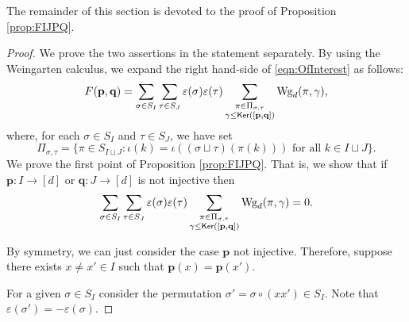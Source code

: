 \documentclass[11pt, a4paper, oneside, reqno]{amsart}
\newcommand{\copairpq}{{[{\bf p},{\bf q}]}}
\theoremstyle{remark}
\theoremstyle{definition}
\numberwithin{equation}{section}
\begin{document}

The remainder of this section is devoted to the proof of Proposition \ref{prop:FIJPQ}.
\begin{proof}
We prove the two assertions in the statement separately. By using the Weingarten calculus, we expand the right hand-side of \eqref{eqn:OfInterest} as follows:
\begin{equation}
	\label{eqn:FIJPQ}
	F({\bf p}, {\bf q}) = \sum_{\sigma \in S_I}\sum_{\tau \in S_J}\varepsilon(\sigma)\varepsilon(\tau)
	\sum_{\substack{\pi \in \Pi_{\sigma,\tau}\\\gamma\leq {\sf Ker}(\copairpq)}}
	\text{Wg}_d(\pi, \gamma),
\end{equation}
where, for each $\sigma \in S_I$ and $\tau \in S_J$, we have set
$$
	\Pi_{\sigma,\tau}= \{\pi \in S_{I \sqcup J} : \iota(k) = \iota((\sigma\sqcup \tau)(\pi(k))) \text{ for all } k \in I \sqcup J\}.
$$
We prove the first point of Proposition \ref{prop:FIJPQ}. That is, we show that if $\mathbf p: I \rightarrow [d]$ or $\mathbf q: J \rightarrow [d]$ is not injective then
\begin{equation*}
	\sum_{\sigma \in S_I}\sum_{\tau \in S_J}\varepsilon(\sigma)\varepsilon(\tau)
	\sum_{\substack{\pi \in \Pi_{\sigma,\tau}\\\gamma\leq {\sf Ker}(\copairpq)}}
	\text{Wg}_d(\pi, \gamma) = 0.
\end{equation*}

By symmetry, we can just consider the case $\mathbf {p} $ not injective. Therefore, suppose there exists $x \neq x' \in I$ such that $\mathbf p(x) = \mathbf p(x')$.

For a given $\sigma \in S_I$ consider the permutation $\sigma ' = \sigma \circ (xx') \in S_I$. Note that $\varepsilon(\sigma') = -\varepsilon(\sigma)$.


\end{proof}
\end{document}
